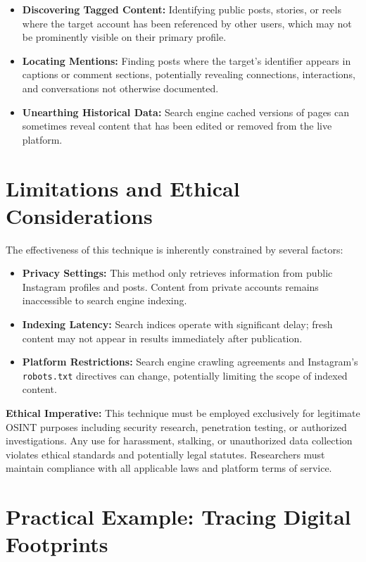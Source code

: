 \documentclass[12pt]{article}
\begin{document}
\begin{itemize}
    \item \textbf{Discovering Tagged Content:} Identifying public posts, stories, or reels where the target account has been referenced by other users, which may not be prominently visible on their primary profile.
    \item \textbf{Locating Mentions:} Finding posts where the target's identifier appears in captions or comment sections, potentially revealing connections, interactions, and conversations not otherwise documented.
    \item \textbf{Unearthing Historical Data:} Search engine cached versions of pages can sometimes reveal content that has been edited or removed from the live platform.
\end{itemize}

\section{Limitations and Ethical Considerations}

The effectiveness of this technique is inherently constrained by several factors:

\begin{itemize}
    \item \textbf{Privacy Settings:} This method only retrieves information from public Instagram profiles and posts. Content from private accounts remains inaccessible to search engine indexing.
    \item \textbf{Indexing Latency:} Search indices operate with significant delay; fresh content may not appear in results immediately after publication.
    \item \textbf{Platform Restrictions:} Search engine crawling agreements and Instagram's \texttt{robots.txt} directives can change, potentially limiting the scope of indexed content.
\end{itemize}

\textbf{Ethical Imperative:} This technique must be employed exclusively for legitimate OSINT purposes including security research, penetration testing, or authorized investigations. Any use for harassment, stalking, or unauthorized data collection violates ethical standards and potentially legal statutes. Researchers must maintain compliance with all applicable laws and platform terms of service.

\section{Practical Example: Tracing Digital Footprints}
\end{document}
